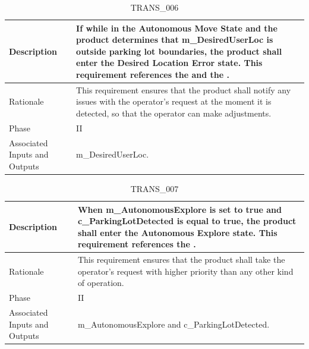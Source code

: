 \documentclass{article}
\begin{document}
\begin{table}[!h]
\begin{center}
\caption {TRANS\_006} 
\label{TRANS_006}
\begin{tabular}{ | m{3cm} | m{11cm} | }
\hline
Description & If while in the Autonomous Move State and the product determines that m\_DesiredUserLoc is outside parking lot boundaries, the product shall enter the Desired Location Error state. This requirement references the \nameref{Autonomous Move State} and the \nameref{Desired Location Error State}. \\
\hline
Rationale & This requirement ensures that the product shall notify any issues with the operator's request at the moment it is detected, so that the operator can make adjustments. \\
\hline
Phase & II \\
\hline
Associated Inputs and Outputs & m\_DesiredUserLoc. \\
\hline
\end{tabular}
\end{center}
\end{table}

\begin{table}[!h]
\begin{center}
\caption {TRANS\_007} 
\label{TRANS_007}
\begin{tabular}{ | m{3cm} | m{11cm} | }
\hline
Description & When m\_AutonomousExplore is set to true and c\_ParkingLotDetected is equal to true, the product shall enter the Autonomous Explore state. This requirement references the \nameref{Autonomous Explore State}. \\
\hline
Rationale & This requirement ensures that the product shall take the operator's request with higher priority than any other kind of operation. \\
\hline
Phase & II \\
\hline
Associated Inputs and Outputs & m\_AutonomousExplore and c\_ParkingLotDetected. \\
\hline
\end{tabular}
\end{center}
\end{table}
\end{document}
